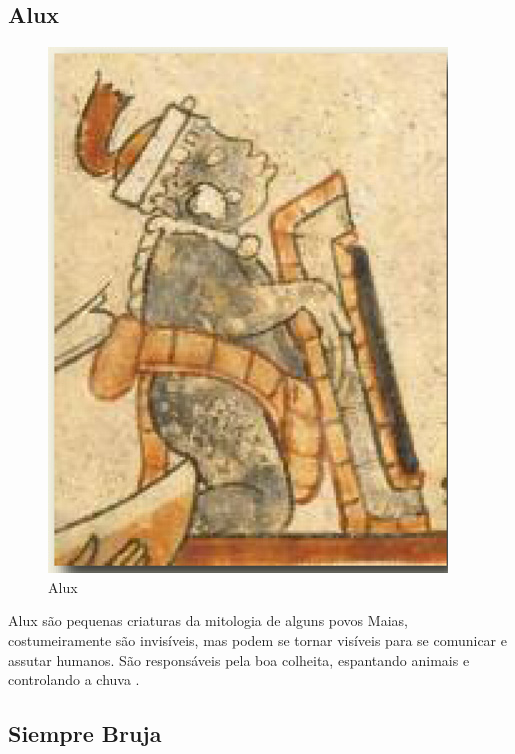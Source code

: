 \vfill
\pagebreak


\subsection{Alux}
\begin{figure}[htb]
	\caption{\label{fig_grafico}Alux}
	\begin{center}
	    \includegraphics[width=\textwidth/2]{imagens/alux.jpg}
	\end{center}
\end{figure}

Alux são pequenas criaturas da mitologia de alguns povos Maias, costumeiramente são invisíveis, mas podem se tornar visíveis para se comunicar e assutar humanos.  São responsáveis pela boa colheita, espantando animais e controlando a chuva \cite{judith_2009}. 

\vfill
\pagebreak

\subsection{Siempre Bruja}

